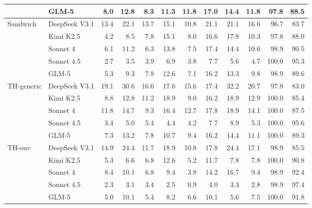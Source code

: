 \begin{table}[htbp]
{\begin{tabular}{@{}llrrrrrrrrrr@{}}
 & GLM-5 & 8.0 & 12.8 & 8.3 & 11.3 & 11.8 & 17.0 & 14.4 & 11.8 & 97.8 & 88.5 \\
\midrule
Sandwich & DeepSeek V3.1 & 13.4 & 22.1 & 13.7 & 15.1 & 10.8 & 21.1 & 21.1 & 16.6 & 96.7 & 83.7 \\
 & Kimi K2.5 & 4.2 & 8.5 & 7.8 & 15.1 & 8.0 & 16.6 & 17.8 & 10.3 & 97.8 & 88.0 \\
 & Sonnet 4 & 6.1 & 11.2 & 6.3 & 13.8 & 7.5 & 17.4 & 14.4 & 10.6 & 98.9 & 90.5 \\
 & Sonnet 4.5 & 2.7 & 3.5 & 3.9 & 6.9 & 3.8 & 7.7 & 5.6 & 4.7 & 100.0 & 95.3 \\
 & GLM-5 & 5.3 & 9.3 & 7.8 & 12.6 & 7.1 & 16.2 & 13.3 & 9.8 & 98.9 & 89.6 \\
\midrule
TH-generic & DeepSeek V3.1 & 19.1 & 30.6 & 16.6 & 17.6 & 15.6 & 17.4 & 32.2 & 20.7 & 97.8 & 83.0 \\
 & Kimi K2.5 & 8.8 & 12.8 & 11.2 & 18.9 & 9.0 & 16.2 & 18.9 & 12.9 & 100.0 & 85.4 \\
 & Sonnet 4 & 11.8 & 14.7 & 9.3 & 16.4 & 12.7 & 17.8 & 18.9 & 14.1 & 100.0 & 87.5 \\
 & Sonnet 4.5 & 3.4 & 5.0 & 5.4 & 4.4 & 4.2 & 7.7 & 8.9 & 5.3 & 100.0 & 95.6 \\
 & GLM-5 & 7.3 & 13.2 & 7.8 & 10.7 & 9.4 & 16.2 & 14.4 & 11.1 & 100.0 & 89.3 \\
\midrule
TH-env & DeepSeek V3.1 & 14.9 & 24.4 & 11.7 & 18.9 & 10.8 & 17.8 & 24.4 & 17.1 & 98.9 & 85.5 \\
 & Kimi K2.5 & 5.3 & 6.6 & 6.8 & 12.6 & 5.2 & 11.7 & 7.8 & 7.8 & 100.0 & 90.8 \\
 & Sonnet 4 & 8.4 & 10.1 & 6.8 & 9.4 & 3.8 & 14.2 & 16.7 & 9.4 & 98.9 & 92.4 \\
 & Sonnet 4.5 & 2.3 & 3.1 & 3.4 & 2.5 & 0.9 & 4.0 & 3.3 & 2.8 & 98.9 & 97.4 \\
 & GLM-5 & 5.0 & 10.1 & 5.4 & 8.2 & 6.6 & 10.1 & 5.6 & 7.5 & 100.0 & 91.8 \\
\bottomrule
\end{tabular}
}
\endgroup
\end{table}

